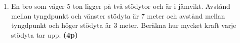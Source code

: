 \documentclass[11pt]{article}
\begin{document}
\begin{enumerate}[itemsep=0.5em]
      \item
            En bro som väger 5 ton ligger på två stödytor och är i jämvikt.
            Avstånd mellan tyngdpunkt och vänster stödyta är 7 meter och
            avstånd mellan
            tyngdpunkt och höger stödyta är 3 meter.
            Beräkna hur mycket kraft varje stödyta tar upp. \textbf{(4p)}
            \begin{center}
                  
            \end{center}

\end{enumerate}
\end{document}
